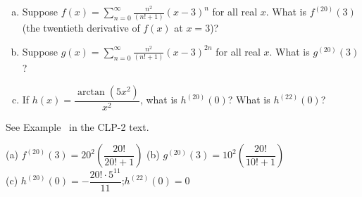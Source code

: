 \begin{Mquestion}
\begin{enumerate}[(a)]
\item Suppose $f(x)=\displaystyle\sum_{n=0}^\infty \frac{n^2}{(n!+1)}(x-3)^n$ for all real $x$. What is $f^{(20)}(3)$ (the twentieth derivative of $f(x)$ at $x=3$)?
\item Suppose $g(x)=\displaystyle\sum_{n=0}^\infty \frac{n^2}{(n!+1)}(x-3)^{2n}$ for all real $x$. What is $g^{(20)}(3)$?
\item If $h(x)=\dfrac{\arctan(5x^2)}{x^2}$, what is $h^{(20)}(0)$? What is $h^{(22)}(0)$?
\end{enumerate}
\end{Mquestion}
\begin{hint}
See Example~ in the CLP-2 text.
\end{hint}
\begin{answer}
(a) $f^{(20)}(3)=20^2\left(\dfrac{20!}{20!+1}\right)$\qquad
(b) $g^{(20)}(3)=10^2\left(\dfrac{20!}{10!+1}\right)$\\
(c) $h^{(20)}(0)=-\dfrac{20!\cdot 5^{11}}{11}$;\quad $h^{(22)}(0)=0$
\end{answer}
